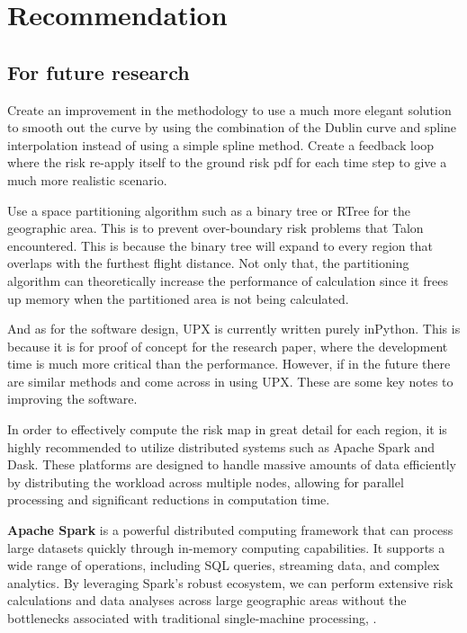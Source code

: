 \documentclass[12pt]{report}
\begin{document}
    \section{Recommendation}
        \subsection{For future research}
        Create an improvement in the methodology to use a much more elegant solution to smooth out the curve by using
        the combination of the Dublin curve and spline interpolation instead of using a simple spline method. Create a
        feedback loop where the risk re-apply itself to the ground risk pdf for each time step to give a much more
        realistic scenario.
        
        Use a space partitioning algorithm such as a binary tree or RTree for the geographic area. This is to prevent
        over-boundary risk problems that Talon encountered. This is because the binary tree will expand to every region
        that overlaps with the furthest flight distance. Not only that, the partitioning algorithm can theoretically
        increase the performance of calculation since it frees up memory when the partitioned area is not being
        calculated.

        And as for the software design, UPX is currently written purely inPython. This is because it is for proof of
        concept for the research paper, where the development time is much more critical than the performance. However,
        if in the future there are similar methods and come across in using UPX. These are some key notes to improving
        the software.

        In order to effectively compute the risk map in great detail for each region, it is highly recommended to
        utilize distributed systems such as Apache Spark and Dask. These platforms are designed to handle massive
        amounts of data efficiently by distributing the workload across multiple nodes, allowing for parallel processing
        and significant reductions in computation time.

        
        \textbf{Apache Spark} is a powerful distributed computing framework that can process large datasets quickly
        through in-memory computing capabilities. It supports a wide range of operations, including SQL queries,
        streaming data, and complex analytics. By leveraging Spark's robust ecosystem, we can perform extensive risk
        calculations and data analyses across large geographic areas without the bottlenecks associated with traditional
        single-machine processing, \cite{the_apache_software_foundation_sparkr_2024}.
        
\end{document}
